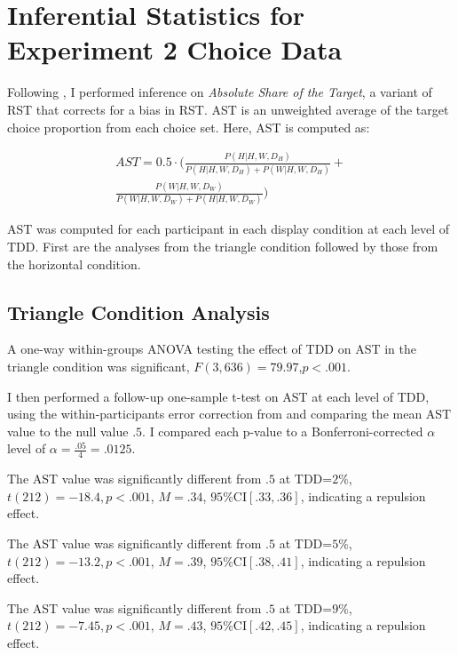 \chapter{Inferential Statistics for Experiment 2 Choice Data}

Following \textcite{katsimpokisRobustBayesianTest2022}, I performed inference on \textit{Absolute Share of the Target}, a variant of RST that corrects for a bias in RST. AST is an unweighted average of the target choice proportion from each choice set. Here, AST is computed as:

\begin{equation}
    \begin{aligned}
        AST=0.5 \cdot (\frac{P(H|{H,W,D_{H}})}{P(H|{H,W,D_{H}})+P(W|{H,W,D_{H}})}+ \\
        \frac{P(W|{H,W,D_{W}})}{P(W|{H,W,D_{W}})+P(H|{H,W,D_{W}})})
    \end{aligned}
\end{equation}

AST was computed for each participant in each display condition at each level of TDD. First are the analyses from the triangle condition followed by those from the horizontal condition. 

\section{Triangle Condition Analysis}
A one-way within-groups ANOVA testing the effect of TDD on AST in the triangle condition was significant, $\textit{F}(3,636)=79.97$,$\textit{p}<.001$. 

I then performed a follow-up one-sample t-test on AST at each level of TDD, using the within-participants error correction from \textcite{cousineau2014error} and comparing the mean AST value to the null value $.5$. I compared each p-value to a Bonferroni-corrected $\alpha$ level of $\alpha=\frac{.05}{4}=.0125$. 

The AST value was significantly different from $.5$ at TDD=$2\%$, $\textit{t}(212)=-18.4,\textit{p}<.001$, $\textit{M}=.34$, $95\%\text{CI}[.33,.36]$, indicating a repulsion effect. 

The AST value was significantly different from $.5$ at TDD=$5\%$, $\textit{t}(212)=-13.2,\textit{p}<.001$, $\textit{M}=.39$, $95\%\text{CI}[.38,.41]$, indicating a repulsion effect. 

The AST value was significantly different from $.5$ at TDD=$9\%$, $\textit{t}(212)=-7.45,\textit{p}<.001$, $\textit{M}=.43$, $95\%\text{CI}[.42,.45]$, indicating a repulsion effect. 

